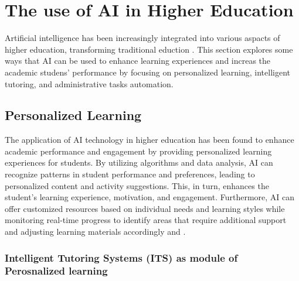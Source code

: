\section{The use of AI in Higher Education }\label{use-ai}
\justifying
Artificial intelligence has been increasingly integrated into various aspacts of higher
education, transforming traditional eduction \citep{wang_exploring_2023}. This section explores
some ways that AI can be used to enhance learning experiences and increas the academic studens' performance
by focusing on  personalized learning, intelligent tutoring, and administrative tasks automation.

\subsection{Personalized Learning}
The application of AI technology in higher education has been found to enhance academic performance and 
engagement by providing personalized learning experiences for students. By utilizing algorithms and 
data analysis, AI can recognize patterns in student performance and preferences, leading to personalized 
content and activity suggestions. This, in turn, enhances the student's learning experience, motivation, 
and engagement. Furthermore, AI can offer customized resources based on individual needs and learning styles 
while monitoring real-time progress to identify areas that require additional support and adjusting learning 
materials accordingly 
\citep{guerrero-quinonez_artificial_2023} and \citep{l_d_of_cs_akshara_first_grade_college_2023}.



\subsubsection{Intelligent Tutoring Systems (ITS) as module of Perosnalized learning}

